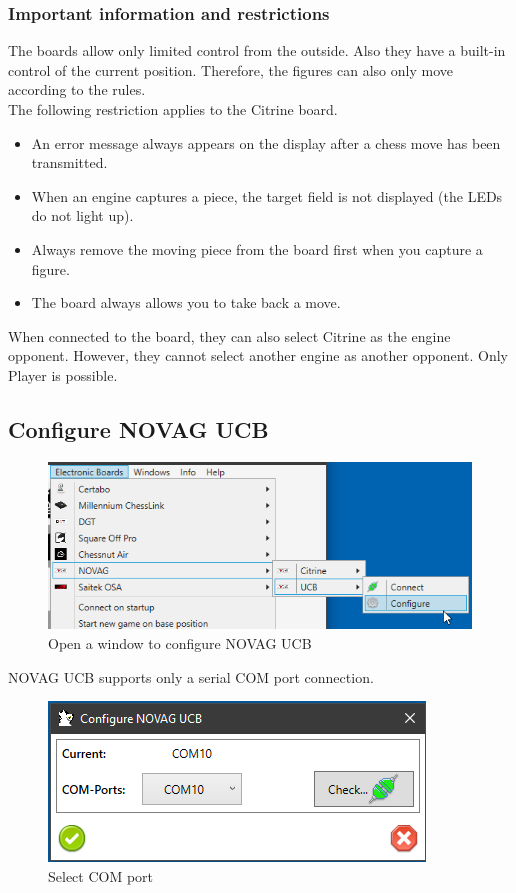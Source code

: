 \documentclass[11pt,a4paper]{article}
\begin{document}
\subsubsection{Important information and restrictions} \label{InformationNovagCitrine}
The boards allow only limited control from the outside. Also they have a built-in control of the current position. Therefore, the figures can also only move according to the rules.\\
The following restriction applies to the Citrine board.

\begin{itemize}
	\item An error message always appears on the display after a chess move has been transmitted.
	\item When an engine captures a piece, the target field is not displayed (the LEDs do not light up).
	\item Always remove the moving piece from the board first when you capture a figure.
	\item The board always allows you to take back a move.
\end{itemize}

When connected to the board, they can also select Citrine as the engine opponent.
However, they cannot select another engine as another opponent. Only Player is possible.

\subsection{Configure NOVAG UCB} \label{ConfigureNovagUCB}

\begin{figure}[H]
	\centering
	\includegraphics[scale=0.8]{NovagUCB1.png}
	\caption{Open a window to configure NOVAG UCB}
	\label{fig:NovagUCB1}
\end{figure}

NOVAG UCB supports only a serial COM port connection.

\begin{figure}[H]
	\centering
	\includegraphics[scale=1.0]{NovagUCB2.png}
	\caption{Select COM port}
	\label{fig:NovagUCB2}
\end{figure}
\end{document}
